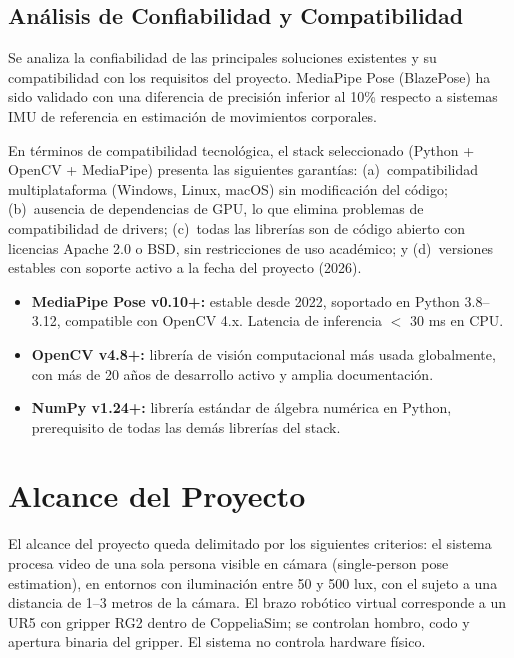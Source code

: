 \subsection{Análisis de Confiabilidad y Compatibilidad}

Se analiza la confiabilidad de las principales soluciones existentes y su
compatibilidad con los requisitos del proyecto. MediaPipe Pose (BlazePose)
ha sido validado con una diferencia de precisión
inferior al 10\% respecto a sistemas IMU de referencia en estimación de
movimientos corporales. \cite{Pauzietal2021}

En términos de compatibilidad tecnológica, el stack seleccionado
(Python + OpenCV + MediaPipe) presenta las siguientes garantías:
(a)~compatibilidad multiplataforma (Windows, Linux, macOS) sin modificación
del código; (b)~ausencia de dependencias de GPU, lo que elimina problemas
de compatibilidad de drivers; (c)~todas las librerías son de código
abierto con licencias Apache 2.0 o BSD, sin restricciones de uso
académico; y (d)~versiones estables con soporte activo a la fecha del
proyecto (2026). \cite{Bazarevskyetal2020, Lugaresietal2019, Bradski2000}

\begin{itemize}[leftmargin=1.5em]
  \item \textbf{MediaPipe Pose v0.10+:} estable desde 2022, soportado
        en Python 3.8--3.12, compatible con OpenCV 4.x. Latencia de
        inferencia $<$ 30 ms en CPU. \cite{Bazarevskyetal2020}
  \item \textbf{OpenCV v4.8+:} librería de visión computacional más
        usada globalmente, con más de 20 años de desarrollo activo y
        amplia documentación. \cite{Bradski2000}
  \item \textbf{NumPy v1.24+:} librería estándar de álgebra numérica
        en Python, prerequisito de todas las demás librerías del stack.
\end{itemize}

\section{Alcance del Proyecto}

El alcance del proyecto queda delimitado por los siguientes criterios:
el sistema procesa video de una sola persona visible en cámara
(single-person pose estimation), en entornos con iluminación
entre 50 y 500 lux, con el sujeto a una distancia de 1--3 metros de la
cámara. El brazo robótico virtual corresponde a un UR5 con gripper RG2 dentro
de CoppeliaSim; se controlan hombro, codo y apertura binaria del gripper. El
sistema no controla hardware físico. \cite{Vintimilla2026}

